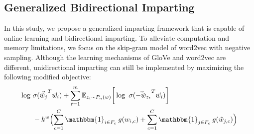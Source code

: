 \documentclass[11pt,a4paper]{article}
\newcommand{\indicator}{\ensuremath{\mathbbm{1}}}
\begin{document}

\subsection{Generalized Bidirectional Imparting }
\label{sec:gen_imparting}

In this study, we propose a generalized imparting framework that is capable of online learning and bidirectional imparting. To alleviate computation and memory limitations, we focus on the skip-gram model of word2vec with negative sampling.
Although the learning mechanisms of GloVe and word2vec are
different, unidirectional imparting can still be implemented
by maximizing the following modified objective:
\begin{align}
\begin{split}
\log ~ & \sigma ({\vec{\tilde{w}}_{j}}^T \vec{w}_{i}) + \sum_{t = 1}^{m} {\mathbb{E}}_{z_t \sim P_n(w)} \bigg[ \log ~ \sigma({\vec{-\tilde{w}}_{z_t}}^T \vec{w}_{i}) \bigg] \\ 
& -k^w \Bigl(  \sum_{c=1}^{C} \indicator_{i\in{}F_c} \: g(w_{i,c}) + \sum_{c=1}^{C} \indicator_{j \in F_c} \: g(\tilde{w}_{j,c}) \Bigr)
\end{split}
\label{eq:word2vec_uni}
\end{align}
\end{document}
